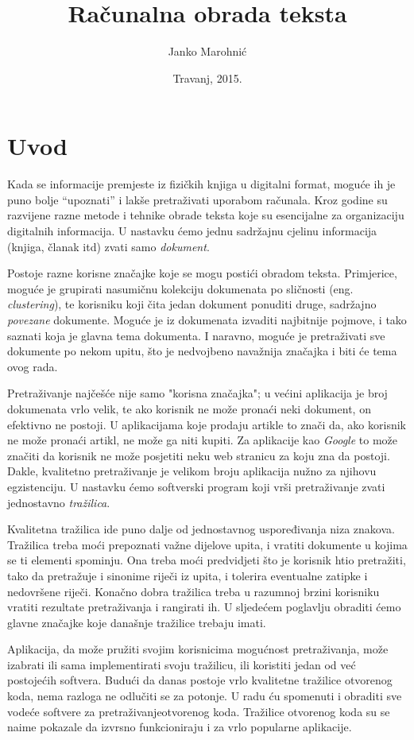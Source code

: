 \documentclass[a4paper,twoside,12pt]{scrreprt}
\title{Računalna obrada teksta}
\author{Janko Marohnić}
\date{Travanj, 2015.}
\begin{document}
\frontmatter

\chapter{Uvod}

Kada se informacije premjeste iz fizičkih knjiga u digitalni format, moguće ih je puno bolje ``upoznati'' i lakše pretraživati uporabom računala. Kroz godine su razvijene razne metode i tehnike obrade teksta koje su esencijalne za organizaciju digitalnih informacija. U nastavku ćemo jednu sadržajnu cjelinu informacija (knjiga, članak itd) zvati samo \textit{dokument}.

Postoje razne korisne značajke koje se mogu postići obradom teksta. Primjerice, moguće je grupirati nasumičnu kolekciju dokumenata po sličnosti (eng. \textit{clustering}), te korisniku koji čita jedan dokument ponuditi druge, sadržajno \textit{povezane} dokumente. Moguće je iz dokumenata izvaditi najbitnije pojmove, i tako saznati koja je glavna tema dokumenta. I naravno, moguće je pretraživati sve dokumente po nekom upitu, što je nedvojbeno navažnija značajka i biti će tema ovog rada.

Pretraživanje najčešće nije samo "korisna značajka"; u većini aplikacija je broj dokumenata vrlo velik, te ako korisnik ne može pronaći neki dokument, on efektivno ne postoji. U aplikacijama koje prodaju artikle to znači da, ako korisnik ne može pronaći artikl, ne može ga niti kupiti. Za aplikacije kao \textit{Google} to može značiti da korisnik ne može posjetiti neku web stranicu za koju zna da postoji. Dakle, kvalitetno pretraživanje je velikom broju aplikacija nužno za njihovu egzistenciju. U nastavku ćemo softverski program koji vrši pretraživanje zvati jednostavno \textit{tražilica}.

Kvalitetna tražilica ide puno dalje od jednostavnog uspoređivanja niza znakova. Tražilica treba moći prepoznati važne dijelove upita, i vratiti dokumente u kojima se ti elementi spominju. Ona treba moći predvidjeti što je korisnik htio pretražiti, tako da pretražuje i sinonime riječi iz upita, i tolerira eventualne zatipke i nedovršene riječi. Konačno dobra tražilica treba u razumnoj brzini korisniku vratiti rezultate pretraživanja i rangirati ih. U sljedećem poglavlju obraditi ćemo glavne značajke koje današnje tražilice trebaju imati.

Aplikacija, da može pružiti svojim korisnicima mogućnost pretraživanja, može izabrati ili sama implementirati svoju tražilicu, ili koristiti jedan od već postojećih softvera. Budući da danas postoje vrlo kvalitetne tražilice otvorenog koda, nema razloga ne odlučiti se za potonje. U radu ću spomenuti i obraditi sve vodeće softvere za pretraživanjeotvorenog koda. Tražilice otvorenog koda su se naime pokazale da izvrsno funkcioniraju i za vrlo popularne aplikacije.
\end{document}
